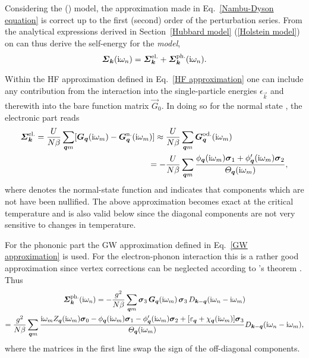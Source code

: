 Considering the  () model, the approximation made
in Eq.~\ref{Nambu-Dyson equation} is correct up to the first (second) order of
the perturbation series. From the analytical expressions derived in
Section~\ref{Hubbard model} (\ref{Holstein model}) on can thus derive the
self-energy for the \emph{ model},
%
\begin{equation*}
    \boldsymbol {\varSigma}_{\boldsymbol k} (\mathrm i \omega_n)
    = \boldsymbol {\varSigma}_{\boldsymbol k} \sp{\text{el.}}
    + \boldsymbol {\varSigma}_{\boldsymbol k} \sp{\text{ph.}} (\mathrm i \omega_n).
\end{equation*}

Within the HF approximation defined in Eq.~\ref{HF approximation} one can
include any contribution from the  interaction into the
single-particle energies $\epsilon_{\vec k}$ and therewith into the bare
 function matrix $\vec G_0$. In doing so for the normal state
\cite[37]{AllenMitrovic82}, the electronic part reads
%
\begin{align*}
    \boldsymbol {\varSigma}_{\boldsymbol k} \sp{\text{el.}}
    = \frac{U}{N \beta} \sum_{\boldsymbol q m}
        [ \boldsymbol G_{\boldsymbol q} (\mathrm i \omega_m)
        - \boldsymbol G_{\boldsymbol q} \sp{\text{n.}} (\mathrm i \omega_m) ]
    \approx \frac{U}{N \beta} &\sum_{\boldsymbol q m}
        \boldsymbol G_{\boldsymbol q} \sp{\text{od.}} (\mathrm i \omega_m)
    \\
    = -\frac{U}{N \beta} &\sum_{\boldsymbol q m} \frac
        { \phi _{\boldsymbol q}(\mathrm i \omega_m) \boldsymbol \sigma_1
        + \phi'_{\boldsymbol q}(\mathrm i \omega_m) \boldsymbol \sigma_2 }
        {\varTheta_{\boldsymbol q}(\mathrm i \omega_m)},
\end{align*}
%
where  denotes the normal-state  function and 
indicates that components which are not  have been nullified.
The above approximation becomes exact at the critical temperature and is also
valid below \cite[38]{AllenMitrovic82} since the diagonal components are not
very sensitive to changes in temperature.

For the phononic part the GW approximation defined in Eq.~\ref{GW approximation}
is used. For the electron-phonon interaction this is a rather good approximation
since vertex corrections can be neglected according to 's theorem
\cite{Migdal58}. Thus
%
\begin{multline*}
    \boldsymbol {\varSigma}_{\boldsymbol k} \sp{\text{ph.}} (\mathrm i \omega_n)
    = -\frac{g^2}{N \beta} \sum_{\boldsymbol q m}
    \boldsymbol \sigma_3 \, \boldsymbol G_{\boldsymbol q}(\mathrm i \omega_m) \, \boldsymbol \sigma_3 \,
    D_{\boldsymbol k - \boldsymbol q}(\mathrm i \omega_n - \mathrm i \omega_m)
    \\
    = \frac{g^2}{N \beta} \sum_{\boldsymbol q m}
    \frac { \mathrm i \omega_m
              Z_{\boldsymbol q}(\mathrm i \omega_m) \boldsymbol \sigma_0
        - \phi _{\boldsymbol q}(\mathrm i \omega_m) \boldsymbol \sigma_1
        - \phi'_{\boldsymbol q}(\mathrm i \omega_m) \boldsymbol \sigma_2
        + [\varepsilon_{\boldsymbol q} + \chi_{\boldsymbol q}(\mathrm i \omega_m)] \boldsymbol \sigma_3 }
        {\varTheta_{\boldsymbol q}(\mathrm i \omega_m)}
    D_{\boldsymbol k - \boldsymbol q}(\mathrm i \omega_n - \mathrm i \omega_m),
\end{multline*}
%
where the  matrices in the first line swap the sign of the
off-diagonal components.

